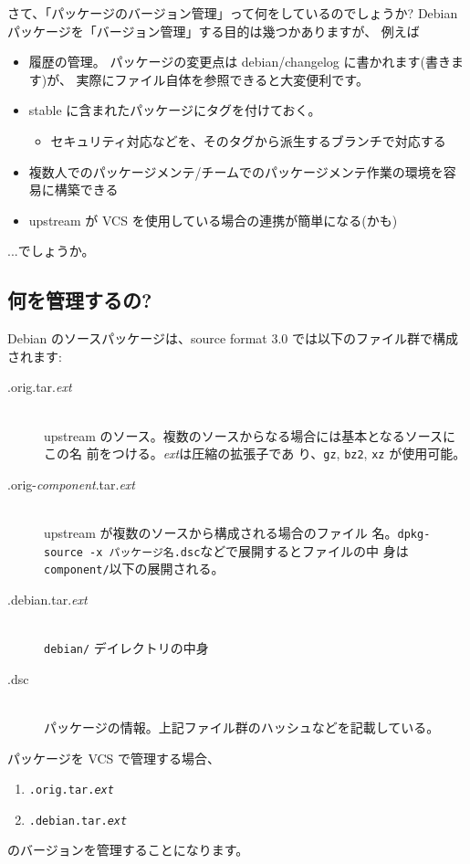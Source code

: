 \documentclass[mingoth,a4paper]{jsarticle}
\begin{document}
さて、「パッケージのバージョン管理」って何をしているのでしょうか?
Debian パッケージを「バージョン管理」する目的は幾つかありますが、
例えば
\begin{itemize}
\item 履歴の管理。
  パッケージの変更点は debian/changelog に書かれます(書きます)が、
  実際にファイル自体を参照できると大変便利です。
\item stable に含まれたパッケージにタグを付けておく。
  \begin{itemize}
  \item セキュリティ対応などを、そのタグから派生するブランチで対応する
  \end{itemize}
\item 複数人でのパッケージメンテ/チームでのパッケージメンテ作業の環境を容易に構築できる
\item upstream が VCS を使用している場合の連携が簡単になる(かも)
\end{itemize}
...でしょうか。

\subsection{何を管理するの?}
Debian のソースパッケージは、source format 3.0 では以下のファイル群で構成されます:
\begin{description}
\item[.orig.tar.{\it{ext}}]　\\
  upstream のソース。複数のソースからなる場合には基本となるソースにこの名
  前をつける。{\it{ext}}は圧縮の拡張子であ
  り、{\tt{gz}}, {\tt{bz2}}, {\tt{xz}} が使用可能。
\item[.orig-{\it{component}}.tar.{\it{ext}}] 　\\
  upstream が複数のソースから構成される場合のファイル
  名。{\tt{dpkg-source -x パッケージ名.dsc}}などで展開するとファイルの中
  身は {\tt{component/}}以下の展開される。
\item[.debian.tar.{\it{ext}}]　\\
  {\tt{debian/}} デイレクトリの中身
\item[.dsc]　\\
  パッケージの情報。上記ファイル群のハッシュなどを記載している。
\end{description}
パッケージを VCS で管理する場合、
\begin{enumerate}
\item {\tt{.orig.tar.{\it{ext}}}}
\item {\tt{.debian.tar.{\it{ext}}}}
\end{enumerate}
のバージョンを管理することになります。
\end{document}
